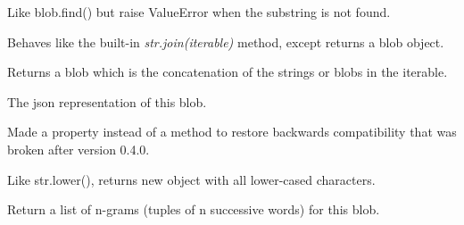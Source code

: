 \documentclass[letterpaper,10pt,english]{sphinxmanual}
\begin{document}
\begin{fulllineitems}
\begin{fulllineitems}
\label{api_reference:textblob_de.blob.TextBlobDE.index}
Like blob.find() but raise ValueError when the substring
is not found.

\end{fulllineitems}


\begin{fulllineitems}
\label{api_reference:textblob_de.blob.TextBlobDE.join}
Behaves like the built-in \emph{str.join(iterable)} method, except
returns a blob object.

Returns a blob which is the concatenation of the strings or blobs
in the iterable.

\end{fulllineitems}


\begin{fulllineitems}
\label{api_reference:textblob_de.blob.TextBlobDE.json}
The json representation of this blob.

Made  a property instead of a method to restore backwards
compatibility that was broken after version 0.4.0.

\end{fulllineitems}


\begin{fulllineitems}
\label{api_reference:textblob_de.blob.TextBlobDE.lower}
Like str.lower(), returns new object with all lower-cased characters.

\end{fulllineitems}


\begin{fulllineitems}
\label{api_reference:textblob_de.blob.TextBlobDE.ngrams}
Return a list of n-grams (tuples of n successive words) for this
blob.


\end{fulllineitems}
\end{fulllineitems}
\end{document}

